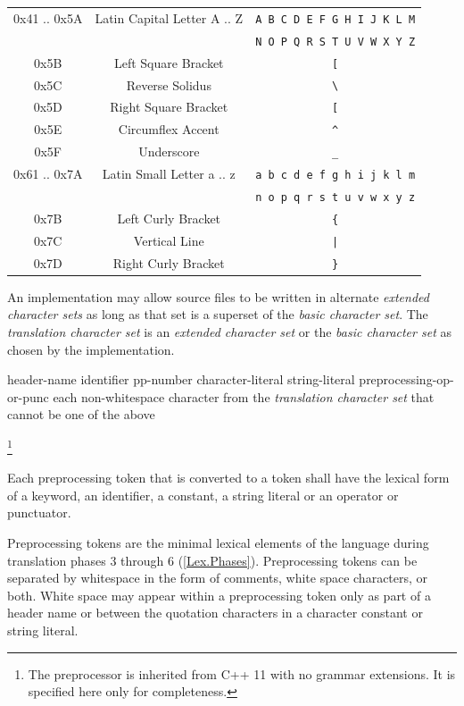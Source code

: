 \begin{center}
\begin{tabular}{|| c | c | c ||}
    0x41 .. 0x5A & Latin Capital Letter A .. Z &
        \texttt{A B C D E F G H I J K L M}\\
    & & \texttt{N O P Q R S T U V W X Y Z}\\
    0x5B & Left Square Bracket & \texttt{[}\\
    0x5C & Reverse Solidus & \texttt{\textbackslash}\\
    0x5D & Right Square Bracket & \texttt{[}\\
    0x5E & Circumflex Accent & \texttt{\textasciicircum}\\
    0x5F & Underscore & \texttt{\_}\\
    0x61 .. 0x7A & Latin Small Letter a .. z &
        \texttt{a b c d e f g h i j k l m}\\
    & & \texttt{n o p q r s t u v w x y z}\\
    0x7B & Left Curly Bracket & \texttt{\{}\\
    0x7C & Vertical Line & \texttt{|}\\
    0x7D & Right Curly Bracket & \texttt{\}}\\
    \hline
  \end{tabular}
\end{center}

\p An implementation may allow source files to be written in alternate
\textit{extended character sets} as long as that set is a superset of the
\textit{basic character set}. The \textit{translation character set} is an
\textit{extended character set} or the \textit{basic character set} as chosen by
the implementation.


\begin{grammar}
  \br
  header-name\br
  identifier\br
  pp-number\br
  character-literal\br
  string-literal\br
  preprocessing-op-or-punc\br
  \textnormal{each non-whitespace character from the \textit{translation
  character set} that cannot be one of the above}
\end{grammar}\footnote{The preprocessor is inherited from C++ 11 with no
grammar extensions. It is specified here only for completeness.}

\p Each preprocessing token that is converted to a token shall have the lexical
form of a keyword, an identifier, a constant, a string literal or an operator or
punctuator.

\p Preprocessing tokens are the minimal lexical elements of the language during
translation phases 3 through 6 (\ref{Lex.Phases}). Preprocessing tokens can be
separated by whitespace in the form of comments, white space characters, or
both. White space may appear within a preprocessing token only as part of a
header name or between the quotation characters in a character constant or
string literal.

